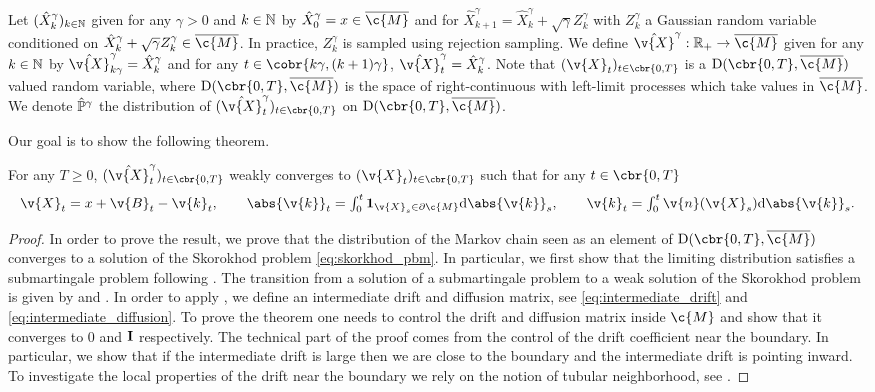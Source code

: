 Let $(\hat{X}_k^\gamma)_{k \in \mathbb{N}}$ given for any $\gamma >0$ and $k \in \mathbb{N}$ by $\hat{X}_0^\gamma = x \in \cl{\c{M}}$ and for $\hat{X}_{k+1}^\gamma = \hat{X}_k^\gamma + \sqrt{\gamma} Z_k^\gamma$ with $Z_k^\gamma$ a Gaussian random variable conditioned on $\hat{X}_k^\gamma + \sqrt{\gamma} Z_k^\gamma \in \cl{\c{M}}$.
In practice, $Z_k^\gamma$ is sampled using rejection sampling.
We define $\hat{\v{X}}^\gamma : \R_+ \to \cl{\c{M}}$ given for any $k \in \mathbb{N}$ by $\hat{\v{X}}^\gamma_{k\gamma} = \hat{X}_k^\gamma$ and for any $t \in \cobr{k\gamma, (k+1)\gamma}$, $\hat{\v{X}}^\gamma_t = \hat{X}_{k}^\gamma$.
Note that $(\v{X}_t)_{t \in \cbr{0,T}}$ is a $\mathrm{D}(\cbr{0,T}, \cl{\c{M}})$ valued random variable, where $\mathrm{D}(\cbr{0,T}, \cl{\c{M}})$ is the space of right-continuous with left-limit processes which take values in $\cl{\c{M}}$.
We denote $\hat{\bb{P}}^\gamma$ the distribution of $(\hat{\v{X}}_t^\gamma)_{t \in \cbr{0,T}}$ on $\mathrm{D}(\cbr{0,T}, \cl{\c{M}})$.

Our goal is to show the following theorem.

\begin{theorem}
	\label{thm:weak_convergence_appendix}
	For any $T \geq 0$, $(\hat{\v{X}}_t^\gamma)_{t \in \cbr{0,T}}$ weakly converges to $(\v{X}_t)_{t \in \cbr{0,T}}$ such that for any $t \in \cbr{0,T}$ \begin{equation} \label{eq:skorkhod_pbm} \textstyle \v{X}_t = x + \v{B}_t - \v{k}_t , \qquad \abs{\v{k}}_t = \int_0^t \bm{1}_{\v{X}_s \in \partial \c{M}} \mathrm{d} \abs{\v{k}}_s , \qquad \v{k}_t = \int_0^t \v{n}(\v{X}_s) \mathrm{d} \abs{\v{k}}_s .
	\end{equation}
\end{theorem}

\begin{proof}
	In order to prove the result, we prove that the distribution of the Markov chain seen as an element of $\mathrm{D}(\cbr{0,T}, \cl{\c{M}})$ converges to a solution of the Skorokhod problem \eqref{eq:skorkhod_pbm}.
	In particular, we first show that the limiting distribution satisfies a submartingale problem following \cite[Theorem 6.3]{stroock1971diffusion}.
	The transition from a solution of a submartingale problem to a weak solution of the Skorokhod problem is given by \cite[Theorem 1, Proposition 2.12]{kang2017submartingale} and \cite[Corollary 2.10]{ramanan2006reflected}.
	In order to apply \cite[Theorem 6.3]{stroock1971diffusion}, we define an intermediate drift and diffusion matrix, see \eqref{eq:intermediate_drift} and \eqref{eq:intermediate_diffusion}.
	To prove the theorem one needs to control the drift and diffusion matrix inside $\c{M}$ and show that it converges to $0$ and $\m{I}$ respectively.
	The technical part of the proof comes from the control of the drift coefficient near the boundary.
	In particular, we show that if the intermediate drift is large then we are close to the boundary and the intermediate drift is pointing inward.
	To investigate the local properties of the drift near the boundary we rely on the notion of tubular neighborhood, see \cite[Theorem 6.24]{lee2013smooth}.
\end{proof}

